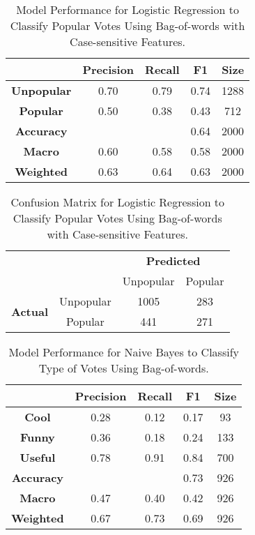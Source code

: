 \documentclass[11pt,a4paper]{article}
\begin{document}
\begin{table}[h!]
\centering
 \begin{tabular}{|c c c c c|} 
 \hline
 & {\bf Precision} & {\bf Recall} & {\bf F1} & {\bf Size} \\ [0.5ex] 
 \hline\hline
 {\bf Unpopular } & 0.70 & 0.79 & 0.74 & 1288\\ 
 {\bf Popular } & 0.50 & 0.38 & 0.43 & 712 \\
 {\bf Accuracy } & & & 0.64 & 2000 \\
 {\bf Macro } & 0.60 & 0.58 & 0.58 & 2000 \\
 {\bf Weighted } & 0.63 & 0.64 & 0.63 & 2000\\ [1ex] 
 \hline
 \end{tabular}
  \caption{\label{tab:Table 8}Model Performance for Logistic Regression to Classify Popular Votes Using Bag-of-words with Case-sensitive Features.}

\end{table}

\clearpage
\begin{table}
\begin{tabular}{cc|cc}
\multicolumn{2}{c}{}
    & \multicolumn{2}{c}{\bf Predicted} \\
    & & Unpopular & Popular \\ 
    \cline{2-4}
\multirow{2}{*}{{\bf Actual}}
    & Unpopular   & 1005 & 283 \\
    & Popular    & 441 & 271 \\ 
    \cline{2-4}
\end{tabular}
  \caption{\label{tab:Table 9}Confusion Matrix for Logistic Regression to Classify Popular Votes Using Bag-of-words with Case-sensitive Features.}
\end{table}

\begin{table}[h!]
\centering
 \begin{tabular}{|c c c c c|} 
 \hline
 & {\bf Precision} & {\bf Recall} & {\bf F1} & {\bf Size} \\ [0.5ex] 
 \hline\hline
 {\bf Cool } & 0.28 & 0.12 & 0.17 & 93\\ 
 {\bf Funny } & 0.36 & 0.18 & 0.24 & 133 \\
 {\bf Useful } & 0.78 & 0.91 & 0.84 & 700 \\

 {\bf Accuracy } & & & 0.73 & 926 \\
 {\bf Macro } & 0.47 & 0.40 & 0.42 & 926 \\
 {\bf Weighted } & 0.67 & 0.73 & 0.69 & 926\\ [1ex] 
 \hline
 \end{tabular}
   \caption{\label{tab:Table 10}Model Performance for Naive Bayes to Classify Type of Votes Using Bag-of-words.}

\end{table}
\end{document}
